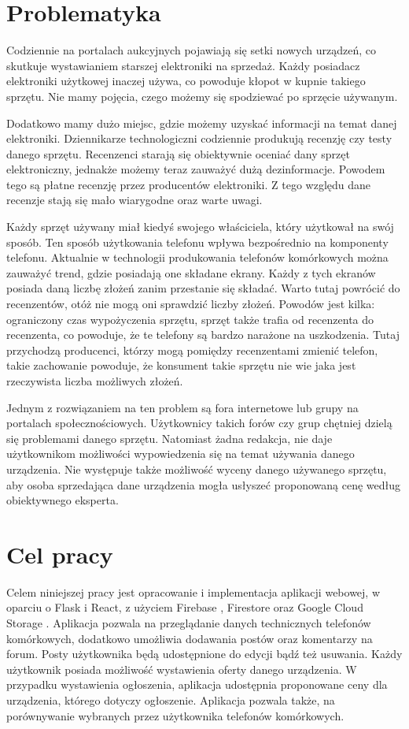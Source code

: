 \section{Problematyka}
Codziennie na portalach aukcyjnych pojawiają się setki nowych urządzeń, co skutkuje wystawianiem starszej elektroniki na sprzedaż. Każdy posiadacz elektroniki użytkowej inaczej używa, co powoduje kłopot w kupnie takiego sprzętu. Nie mamy pojęcia, czego możemy się spodziewać po sprzęcie używanym.

Dodatkowo mamy dużo miejsc, gdzie możemy uzyskać informacji na temat danej elektroniki. Dziennikarze technologiczni codziennie produkują recenzję czy testy danego sprzętu. Recenzenci starają się obiektywnie oceniać dany sprzęt elektroniczny, jednakże możemy teraz zauważyć dużą dezinformacje. Powodem tego są płatne recenzję przez producentów elektroniki. Z tego względu dane recenzje stają się mało wiarygodne oraz warte uwagi.

Każdy sprzęt używany miał kiedyś swojego właściciela, który użytkował na swój sposób. Ten sposób użytkowania telefonu wpływa bezpośrednio na komponenty telefonu. Aktualnie w technologii produkowania telefonów komórkowych można zauważyć trend, gdzie posiadają one składane ekrany. Każdy z tych ekranów posiada daną liczbę złożeń zanim przestanie się składać. Warto tutaj powrócić do recenzentów, otóż nie mogą oni sprawdzić liczby złożeń. Powodów jest kilka: ograniczony czas wypożyczenia sprzętu, sprzęt także trafia od recenzenta do recenzenta, co powoduje, że te telefony są bardzo narażone na uszkodzenia. Tutaj przychodzą producenci, którzy mogą pomiędzy recenzentami zmienić telefon, takie zachowanie powoduje, że konsument takie sprzętu nie wie jaka jest rzeczywista liczba możliwych złożeń.

Jednym z rozwiązaniem na ten problem są fora internetowe lub grupy na portalach społecznościowych. Użytkownicy takich forów czy grup chętniej dzielą się problemami danego sprzętu. Natomiast żadna redakcja, nie daje użytkownikom możliwości wypowiedzenia się na temat używania danego urządzenia. Nie występuje także możliwość wyceny danego używanego sprzętu, aby osoba sprzedająca dane urządzenia mogła usłyszeć proponowaną cenę według obiektywnego eksperta.

\section{Cel pracy}
Celem niniejszej pracy jest opracowanie i implementacja aplikacji webowej, w oparciu o Flask i React, z użyciem Firebase \cite*{firebase}, Firestore \cite*{firestore} oraz Google Cloud Storage \cite*{cloud_storage}. Aplikacja pozwala na przeglądanie danych technicznych telefonów komórkowych, dodatkowo umożliwia dodawania postów oraz komentarzy na forum. Posty użytkownika będą udostępnione do edycji bądź też usuwania. Każdy użytkownik posiada możliwość wystawienia oferty danego urządzenia. W przypadku wystawienia ogłoszenia, aplikacja udostępnia proponowane ceny dla urządzenia, którego dotyczy ogłoszenie. Aplikacja pozwala także, na porównywanie wybranych przez użytkownika telefonów komórkowych.

